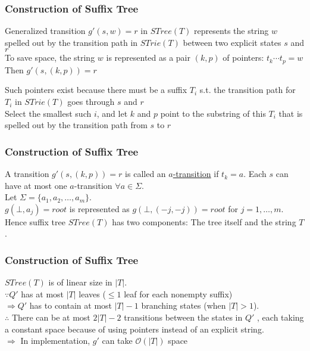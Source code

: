 \documentclass[compress,usenames,dvipsnames]{beamer}
\newenvironment{definitionblock}[1]{
    \setbeamercolor{block title}{bg=cyan}
    \begin{block}{#1}}{\end{block}
}
\begin{document}
    \begin{frame}\frametitle{Construction of Suffix Tree}
        \begin{definitionblock}{Generalized transition}
            $g'(s, w) = r$ in $STree(T)$ represents the string $w$ spelled out by the transition path in $STrie(T)$ between two explicit states $s$ and $r$ \\
            \hfill \break
            To save space, the string $w$ is represented as a pair $(k, p)$ of pointers: $t_k\cdots t_p = w$ \\
            Then $g'(s, (k, p)) = r$
        \end{definitionblock}
        Such pointers exist because there must be a suffix $T_i$ s.t. the transition path for $T_i$ in $STrie(T)$ goes through $s$ and $r$ \\
        \hfill \break
        {\color{red}Select the smallest such $i$, and let $k$ and $p$ point to the substring of this $T_i$ that is spelled out by the transition path from $s$ to $r$}
    \end{frame}

    \begin{frame}\frametitle{Construction of Suffix Tree}
        A transition $g'(s, (k, p)) = r$ is called an \underline{$a$-transition} if $t_k = a$. Each $s$ can have at most one $a$-transition $\forall a \in \Sigma$. \\
        \hfill \break
        Let $\Sigma = \{a_1, a_2, \ldots, a_m \}$. \\
        $g(\bot, a_j) = root$ is represented as $g(\bot, (-j, -j)) = root $ for $ j = 1, \ldots, m$.\\
        \hfill \break
        Hence suffix tree $STree(T)$ has two components: The tree itself and the string $T$.
    \end{frame}

    \begin{frame}\frametitle{Construction of Suffix Tree}
        $STree(T)$ is of linear size in $|T|$. \\
        $\because Q'$ has at most $|T|$ leaves ($\leq 1$ leaf for each nonempty suffix) \\
        $\Rightarrow Q'$ has to contain at most $|T| - 1$ branching states (when $|T| > 1$). \\
        \hfill \break
        $\therefore$ There can be at most $2|T| - 2$ transitions between the states in $Q'$ , each taking a constant space because of using pointers instead of an explicit string. \\
        {\color{red}$\Rightarrow$ In implementation, $g'$ can take $\mathcal{O}(|T|)$ space}
    \end{frame}
\end{document}
